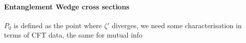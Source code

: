 





\paragraph{Entanglement Wedge cross sections}

$P_0$ is defined as the point where $\zeta'$ diverges, we need some characterisation in terms of CFT data, the same for mutual info
